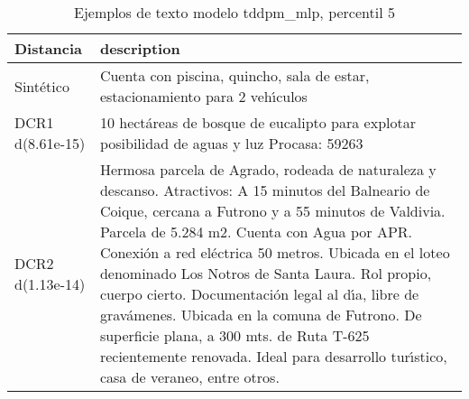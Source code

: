 \begin{table}[H]
\centering
\fontsize{10}{14}\selectfont
\caption{Ejemplos de texto modelo tddpm\_mlp, percentil 5}
\label{table-example-economicos-b-1-tddpm_mlp-5p-text}
\begin{tabular}{|l|m{35em}|}
\hline
\rowcolor[gray]{0.8}
Distancia & description \\
\hline Sintético & Cuenta con piscina, quincho, sala de estar, estacionamiento para 2 veh{\'\i}culos \\
\hline DCR1 d(8.61e-15) & 10 hect\'areas de bosque de eucalipto para explotar  posibilidad de aguas y luz  Procasa: 59263 \\
\hline DCR2 d(1.13e-14) & Hermosa parcela de Agrado, rodeada de naturaleza y descanso.  Atractivos: A 15 minutos del Balneario de Coique, cercana a Futrono y a 55 minutos de Valdivia. Parcela de 5.284 m2. Cuenta con Agua por APR. Conexi\'on a red el\'ectrica 50 metros. Ubicada en el loteo denominado Los Notros de Santa Laura. Rol propio, cuerpo cierto. Documentaci\'on legal al d{\'\i}a, libre de grav\'amenes. Ubicada en la comuna de Futrono. De superficie plana, a 300 mts. de Ruta T-625 recientemente renovada.  Ideal para desarrollo tur{\'\i}stico, casa de veraneo, entre otros. \\
\hline
\end{tabular}
\end{table}
